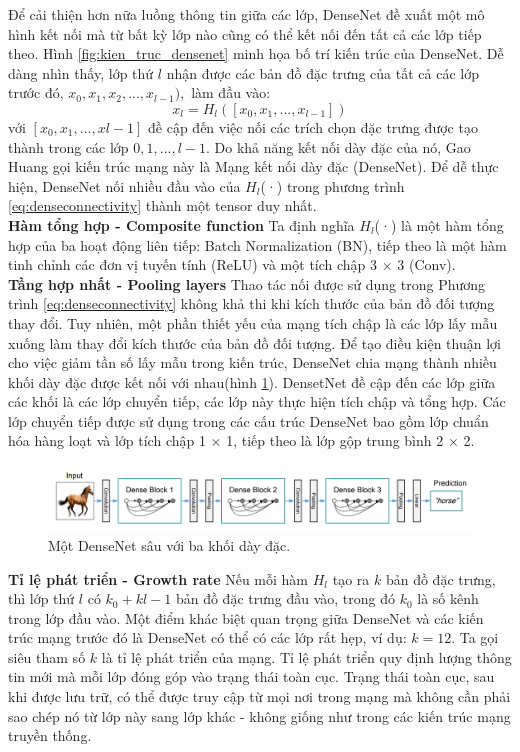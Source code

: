 Để cải thiện hơn nữa luồng thông tin giữa các lớp, DenseNet đề xuất một mô hình kết nối mà từ bất kỳ lớp nào cũng có thể kết nối đến tất cả các lớp tiếp theo. Hình \ref{fig:kien_truc_densenet} minh họa bố trí kiến trúc của DenseNet. Dễ dàng nhìn thấy, lớp thứ $l$ nhận được các bản đồ đặc trưng của tất cả các lớp trước đó, $x_0, x_1, x_2, . . . , x_{l-1}),$ làm đầu vào:
\begin{equation}\label{eq:denseconnectivity}
	x_l = H_l([x_0, x_1, . . . , x_{l-1}])
\end{equation}
với $[x_0, x_1, . . . , x{l-1}]$ đề cập đến việc nối các trích chọn đặc trưng được tạo thành trong các lớp $0, 1, ..., {l-1}$. Do khả năng kết nối dày đặc của nó, Gao Huang\cite{densenet} gọi kiến trúc mạng này là Mạng kết nối dày đặc (DenseNet). Để dễ thực hiện, DenseNet nối nhiều đầu vào của $H_l$(·) trong phương trình \ref{eq:denseconnectivity} thành một tensor duy nhất.\\
{\bf Hàm tổng hợp - Composite function}
Ta định nghĩa $H_l$(·) là một hàm tổng hợp của ba hoạt động liên tiếp: Batch Normalization (BN), tiếp theo là một hàm tinh chỉnh các đơn vị tuyến tính (ReLU) và một tích chập 3 × 3 (Conv).\\
{\bf Tầng hợp nhất - Pooling layers}
Thao tác nối được sử dụng trong Phương trình \ref{eq:denseconnectivity} không khả thi khi kích thước của bản đồ đối tượng thay đổi. Tuy nhiên, một phần thiết yếu của mạng tích chập là các lớp lấy mẫu xuống làm thay đổi kích thước của bản đồ đối tượng. Để tạo điều kiện thuận lợi cho việc giảm tần số lấy mẫu trong kiến trúc, DenseNet chia mạng thành nhiều khối dày đặc được kết nối với nhau(hình \ref{fig:densenet_3blk}). DensetNet đề cập đến các lớp giữa các khối là các lớp chuyển tiếp, các lớp này thực hiện tích chập và tổng hợp. Các lớp chuyển tiếp được sử dụng trong các cấu trúc DenseNet bao gồm lớp chuẩn hóa hàng loạt và lớp tích chập 1 × 1, tiếp theo là lớp gộp trung bình 2 × 2.
\begin{figure}[H]
	\centering
	\includegraphics[width=1\linewidth]{images/densenet_3blk}
	\caption{Một DenseNet sâu với ba khối dày đặc.}
	\label{fig:densenet_3blk}
\end{figure}
{\bf Tỉ lệ phát triển - Growth rate}
Nếu mỗi hàm $H_l$ tạo ra $k$ bản đồ đặc trưng, thì lớp thứ $l$ có $k_0 + k{l-1}$ bản đồ đặc trưng đầu vào, trong đó $k_0$ là số kênh trong lớp đầu vào. Một điểm khác biệt quan trọng giữa DenseNet và các kiến trúc mạng trước đó là DenseNet có thể có các lớp rất hẹp, ví dụ: $k = 12$. Ta gọi siêu tham số $k$ là tỉ lệ phát triển của mạng. Tỉ lệ phát triển quy định lượng thông tin mới mà mỗi lớp đóng góp vào trạng thái toàn cục. Trạng thái toàn cục, sau khi được lưu trữ, có thể được truy cập từ mọi nơi trong mạng mà không cần phải sao chép nó từ lớp này sang lớp khác - không giống như trong các kiến trúc mạng truyền thống.\\
